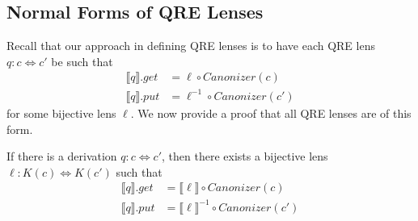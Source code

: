 \documentclass{svproc}
\newcommand{\canonizer}{\ensuremath{\mathit{Canonizer}}}
\begin{document}
\subsection{Normal Forms of QRE Lenses}
Recall that our approach in defining QRE lenses is to have each QRE lens $q: c
\Leftrightarrow c'$ be such that 
\begin{align*}
  \llbracket q \rrbracket.get &= \ell \circ \canonizer(c)\\
  \llbracket q \rrbracket.put &= \ell^{-1} \circ
                                \canonizer(c')
\end{align*}
for some bijective lens $\ell$. We now provide a proof that all QRE lenses are
of this form.
\begin{theorem}\label{normal form}
  If there is a derivation $q : c \Leftrightarrow c'$, then there exists a
  bijective lens $\ell : K(c) \Leftrightarrow K(c')$ such that
  \begin{align*}
    \llbracket q \rrbracket.get &= \llbracket \ell \rrbracket\circ \canonizer(c)\\
    \llbracket q \rrbracket.put &= \llbracket \ell \rrbracket^{-1} \circ
                                  \canonizer(c')
  \end{align*}
\end{theorem}
\end{document}
